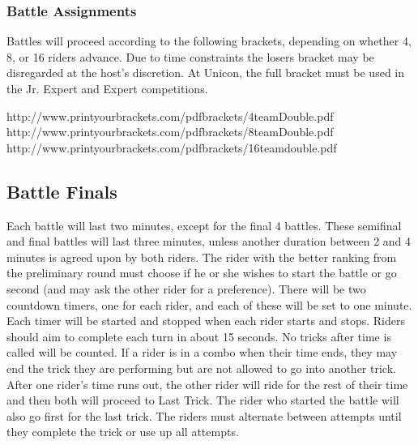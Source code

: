 \subsubsection{Battle Assignments}
Battles will proceed according to the following brackets, depending on whether 4, 8, or 16 riders advance. Due to time constraints the losers bracket may be disregarded at the host's discretion. At Unicon, the full bracket must be used in the Jr. Expert and Expert competitions.

http://www.printyourbrackets.com/pdfbrackets/4teamDouble.pdf \\
http://www.printyourbrackets.com/pdfbrackets/8teamDouble.pdf \\
http://www.printyourbrackets.com/pdfbrackets/16teamdouble.pdf

\subsection{Battle Finals}
Each battle will last two minutes, except for the final 4 battles.
These semifinal and final battles will last three minutes, unless another duration between 2 and 4 minutes is agreed upon by both riders.
The rider with the better ranking from the preliminary round must choose if he or she wishes to start the battle or go second (and may ask the other rider for a preference).
There will be two countdown timers, one for each rider, and each of these will be set to one minute.
Each timer will be started and stopped when each rider starts and stops.
Riders should aim to complete each turn in about 15 seconds.
No tricks after time is called will be counted.
If a rider is in a combo when their time ends, they may end the trick they are performing but are not allowed to go into another trick.
After one rider's time runs out, the other rider will ride for the rest of their time and then both will proceed to Last Trick.
The rider who started the battle will also go first for the last trick.
The riders must alternate between attempts until they complete the trick or use up all attempts.
